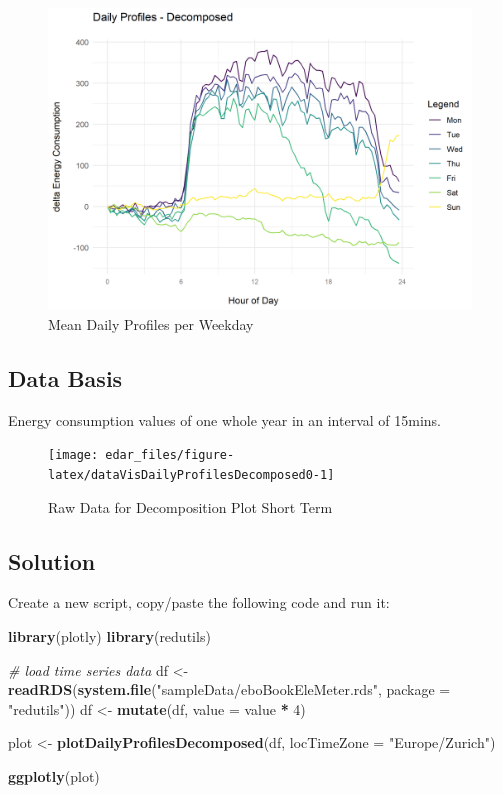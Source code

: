 \documentclass[
  a4paperpaper,
]{book}
\newenvironment{Shaded}{\begin{snugshade}}{\end{snugshade}}
\newcommand{\CommentTok}[1]{\textcolor[rgb]{0.56,0.35,0.01}{\textit{#1}}}
\newcommand{\DataTypeTok}[1]{\textcolor[rgb]{0.13,0.29,0.53}{#1}}
\newcommand{\DecValTok}[1]{\textcolor[rgb]{0.00,0.00,0.81}{#1}}
\newcommand{\KeywordTok}[1]{\textcolor[rgb]{0.13,0.29,0.53}{\textbf{#1}}}
\newcommand{\NormalTok}[1]{#1}
\newcommand{\OperatorTok}[1]{\textcolor[rgb]{0.81,0.36,0.00}{\textbf{#1}}}
\newcommand{\StringTok}[1]{\textcolor[rgb]{0.31,0.60,0.02}{#1}}
\let\oldShaded\Shaded
\let\endoldShaded\endShaded
\renewenvironment{Shaded}{\footnotesize\oldShaded}{\endoldShaded}
\begin{document}
\begin{figure}
\includegraphics[width=0.7\linewidth]{images/plotDailyProfDecomposed} \caption{Mean Daily Profiles per Weekday}\label{fig:unnamed-chunk-19}
\end{figure}

\hypertarget{data-basis-11}{%
\subsection{Data Basis}\label{data-basis-11}}

Energy consumption values of one whole year in an interval of 15mins.

\begin{figure}
\texttt{[image: edar\_files/figure-latex/dataVisDailyProfilesDecomposed0-1]} \caption{Raw Data for Decomposition Plot Short Term}\label{fig:dataVisDailyProfilesDecomposed0}
\end{figure}

\newpage

\hypertarget{solution-11}{%
\subsection{Solution}\label{solution-11}}

Create a new script, copy/paste the following code and run it:

\begin{Shaded}
\begin{Highlighting}[]
\KeywordTok{library}\NormalTok{(plotly)}
\KeywordTok{library}\NormalTok{(redutils)}

\CommentTok{# load time series data}
\NormalTok{df <-}\StringTok{ }\KeywordTok{readRDS}\NormalTok{(}\KeywordTok{system.file}\NormalTok{(}\StringTok{"sampleData/eboBookEleMeter.rds"}\NormalTok{, }\DataTypeTok{package =} \StringTok{"redutils"}\NormalTok{))}
\NormalTok{df <-}\StringTok{ }\KeywordTok{mutate}\NormalTok{(df, }\DataTypeTok{value =}\NormalTok{ value }\OperatorTok{*}\StringTok{ }\DecValTok{4}\NormalTok{)}

\NormalTok{plot <-}\StringTok{ }\KeywordTok{plotDailyProfilesDecomposed}\NormalTok{(df, }\DataTypeTok{locTimeZone =} \StringTok{"Europe/Zurich"}\NormalTok{)}

\KeywordTok{ggplotly}\NormalTok{(plot)}
\end{Highlighting}
\end{Shaded}
\end{document}
